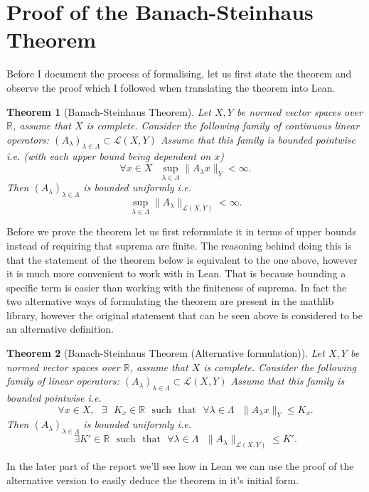 \documentclass[11pt]{article}
\newcommand\R{\mathbb{R}}
\newcommand\sucht{\sep \mathrm{such} \sep \mathrm{that} \sep}
\newcommand\sep{\text{ }}
\newtheorem*{theorem}{Theorem}
\begin{document}
\section*{Proof of the Banach-Steinhaus Theorem}

Before I document the process of formalising, let us first state the
theorem and observe the proof which I followed when translating the theorem
into Lean.
\begin{theorem}[Banach-Steinhaus Theorem]
  Let $X, Y$ be normed vector spaces over $\R$, assume that $X$ is complete. Consider
  the following family of continuous linear operators:
  $\left( A_\lambda \right)_{\lambda \in \Lambda} \subset \mathcal{L}\left( X, Y \right) $
  Assume that this family is bounded pointwise i.e. (with each upper bound being dependent on $x$)
  \[
    \forall x \in X \sep \sup_{\lambda \in \Lambda} \|A_\lambda x\|_Y < \infty
  .\]
  Then $\left( A_\lambda \right)_{\lambda \in \Lambda}$ is bounded uniformly i.e.
  \[
    \sup_{\lambda \in \Lambda} \|A_\lambda \|_{\mathcal{L}\left( X, Y \right) } < \infty
  .\]
\end{theorem}
Before we prove the theorem let us first reformulate it in terms of upper
bounds instead of requiring that suprema are finite. The reasoning behind doing
this is that the statement of the theorem below is equivalent to the one above,
however it is much more convenient to work with in Lean. That is because
bounding a specific term is easier than working with the finiteness of suprema. In
fact the two alternative ways of formulating the theorem are present in the
mathlib library, however the original statement that can be seen above is
considered to be an alternative definition.

\begin{theorem}[Banach-Steinhaus Theorem (Alternative formulation)]
  Let $X, Y$ be normed vector spaces over $\R$, assume that $X$ is complete. Consider
  the following family of linear operators:
  $\left( A_\lambda \right)_{\lambda \in \Lambda} \subset \mathcal{L}\left( X, Y \right) $
  Assume that this family is bounded pointwise i.e.
  \[
    \forall x \in X, \sep \exists \sep K_x \in \R \sucht \forall \lambda \in \Lambda \sep \|A_\lambda x\|_Y \le K_x
  .\]
  Then $\left( A_\lambda \right)_{\lambda \in \Lambda}$ is bounded uniformly i.e.
  \[
    \exists K' \in \R \sucht \forall \lambda \in \Lambda \sep \|A_\lambda \|_{\mathcal{L}\left( X, Y \right) } \le K'  .\]
\end{theorem}

In the later part of the report we'll see how in Lean
we can use the proof of the alternative version to easily deduce the theorem in it's
initial form.
\end{document}
